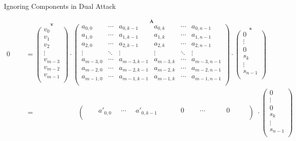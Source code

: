\documentclass[presentation,smaller]{beamer}
\renewcommand{\vec}[1]{\ensuremath{\mathbf{#1}}\xspace}
\begin{document}
\begin{frame}[label={sec:orgef9bc7b}]{Ignoring Components in Dual Attack}
\begin{center}
\scriptsize
\begin{align*}
0 \phantom{xxi} &= \overset{\vec{v}}{\begin{pmatrix}
v_0\\
v_1\\
v_2\\
\vdots\\
v_{m-3}\\
v_{m-2}\\
v_{m-1}\\
\end{pmatrix}} \cdot 
\overset{\vec{A}}{
\left(\begin{array}{ccc|ccc} 
a_{0,0} & \cdots & a_{0,k-1} & a_{0,k} & \cdots & a_{0,n-1}\\
a_{1,0} & \cdots & a_{1,k-1} & a_{1,k} & \cdots & a_{1,n-1}\\
a_{2,0} & \cdots & a_{2,k-1} & a_{2,k} & \cdots & a_{2,n-1}\\
\vdots  & \ddots & \vdots & \vdots & \ddots & \vdots\\
a_{m-3,0} & \cdots & a_{m-3,k-1} & a_{m-3,k} & \cdots & a_{m-3,n-1}\\
a_{m-2,0} & \cdots & a_{m-2,k-1} & a_{m-2,k} & \cdots & a_{m-2,n-1}\\
a_{m-1,0} & \cdots & a_{m-1,k-1} & a_{m-1,k} & \cdots & a_{m-1,n-1}\\
\end{array}\right)} \cdot 
\overset{\vec{s}}{\begin{pmatrix}0\\ \vdots\\ 0\\ \hline s_k\\ \vdots\\ s_{n-1}\\ \end{pmatrix}}\\
&= \phantom{\begin{pmatrix}v_m-3\end{pmatrix} \cdot\ } \left(\begin{array}{ccc|ccc} 
\phantom{xxx} a'_{0,0} \phantom{x} & \cdots & \phantom{x} a'_{0,k-1} \phantom{xi} & \phantom{xxx} 0 \phantom{xxi} & \cdots & \phantom{xxxx} 0 \phantom{xxxx}\\
\end{array}\right) \phantom{i} \cdot {\begin{pmatrix}0\\ \vdots\\ 0\\ \hline s_k\\ \vdots\\ s_{n-1}\\ \end{pmatrix}}\\
\end{align*}
\end{center}
\end{frame}
\end{document}
